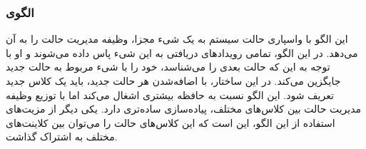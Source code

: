 \subsubsection{الگوی }
\label{smStateSec}
\begin{RTL}
این الگو \cite{ref1} با واسپاری حالت سیستم به یک شیء
مجزا، وظیفه مدیریت حالت را به آن می‌دهد. در این الگو، تمامی رویدادهای دریافتی
به این شیء پاس داده می‌شوند و او با توجه به این که حالت بعدی را می‌شناسد،
خود را با شیء مربوط به حالت جدید جایگزین می‌کند.
در این ساختار، با اضافه‌شدن هر حالت جدید، باید یک کلاس جدید تعریف شود.
این الگو نسبت به  حافظه بیشتری اشغال
می‌کند اما با توزیع وظیفه مدیریت حالت بین کلاس‌های مختلف، پیاده‌سازی
ساده‌تری دارد. یکی دیگر از مزیت‌های استفاده از این الگو، این است که
این کلاس‌های حالت را می‌توان بین کلاینت‌های مختلف به اشتراک گذاشت.
\end{RTL}